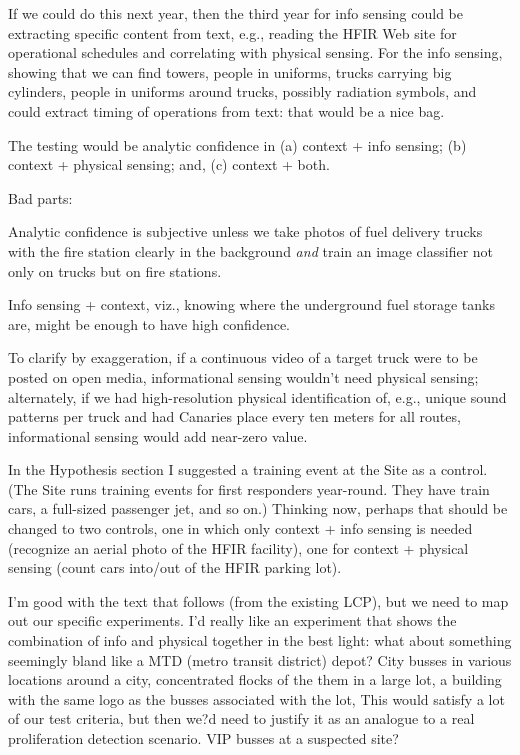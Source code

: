 \documentclass{article} %
\begin{document}
If we could do this next year, then the third year for info sensing could be extracting specific content from text, e.g., reading the HFIR Web site for operational schedules and correlating with physical sensing. For the info sensing, showing that we can find towers, people in uniforms, trucks carrying big cylinders, people in uniforms around trucks, possibly radiation symbols, and could extract timing of operations from text: that would be a nice bag. 

The testing would be analytic confidence in (a) context + info sensing; (b) context + physical sensing; and, (c) context + both. 

Bad parts: 
\begin{enumerate*}
\item Analytic confidence is subjective unless we take photos of fuel delivery trucks with the fire station clearly in the background \textit{and} train an image classifier not only on trucks but on fire stations. 
\item Info sensing + context, viz., knowing where the underground fuel storage tanks are, might be enough to have high confidence.
\end{enumerate*}

To clarify by exaggeration, if a continuous video of a target truck were to be posted on open media, informational sensing wouldn't need physical sensing; alternately, if we had high-resolution physical identification of, e.g., unique sound patterns per truck and had Canaries place every ten meters for all routes, informational sensing would add near-zero value. 

In the Hypothesis section I suggested a training event at the Site as a control. (The Site runs training events for first responders year-round. They have train cars, a full-sized passenger jet, and so on.) Thinking now, perhaps that should be changed to two controls, one in which only context + info sensing is needed (recognize an aerial photo of the HFIR facility), one for context + physical sensing (count cars into/out of the HFIR parking lot). 

I'm good with the text that follows (from the existing LCP), but we need to map out our specific experiments. I'd really like an experiment that shows the combination of info and physical together in the best light: what about something seemingly bland like a MTD (metro transit district) depot? City busses in various locations around a city, concentrated flocks of the them in a large lot, a building with the same logo as the busses associated with the lot, \textellipsis This would satisfy a lot of our test criteria, but then we?d need to justify it as an analogue to a real proliferation detection scenario. VIP busses at a suspected site?
\end{document}
